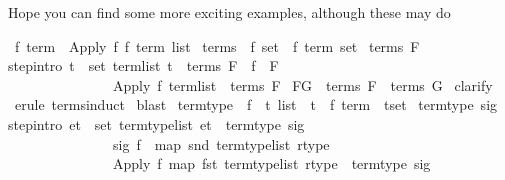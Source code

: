 \begin{isabellebody}
\begin{isamarkuptext}
Hope you can find some more exciting examples, although these may do%
\end{isamarkuptext}%
\ {\isacharprime}f\ {\isachardoublequote}term{\isachardoublequote}\ {\isacharequal}\ Apply\ {\isacharprime}f\ {\isachardoublequote}{\isacharprime}f\ term\ list{\isachardoublequote}\isanewline
\isanewline
{}\ terms\ {\isacharcolon}{\isacharcolon}\ {\isachardoublequote}{\isacharprime}f\ set\ {\isasymRightarrow}\ {\isacharprime}f\ term\ set{\isachardoublequote}\isanewline
{}\ {\isachardoublequote}terms\ F{\isachardoublequote}\isanewline
{}\isanewline
step{\isacharbrackleft}intro{\isacharbrackright}{\isacharcolon}\ {\isachardoublequote}{\isasymlbrakk}{\isasymforall}t\ {\isasymin}\ set\ term{\isacharunderscore}list{\isachardot}\ t\ {\isasymin}\ terms\ F{\isacharsemicolon}\ \ f\ {\isasymin}\ F{\isasymrbrakk}\isanewline
\ \ \ \ \ \ \ \ \ \ \ \ \ \ {\isasymLongrightarrow}\ {\isacharparenleft}Apply\ f\ term{\isacharunderscore}list{\isacharparenright}\ {\isasymin}\ terms\ F{\isachardoublequote}\isanewline
\isanewline
\isanewline
{}\ {\isachardoublequote}F{\isasymsubseteq}G\ {\isasymLongrightarrow}\ terms\ F\ {\isasymsubseteq}\ terms\ G{\isachardoublequote}\isanewline
{}\ clarify\isanewline
{}\ {\isacharparenleft}erule\ terms{\isachardot}induct{\isacharparenright}\isanewline
{}\ blast\isanewline
{}\isanewline
\isanewline
{}\ term{\isacharunderscore}type\ {\isacharcolon}{\isacharcolon}\ {\isachardoublequote}{\isacharparenleft}{\isacharprime}f\ {\isasymRightarrow}\ {\isacharprime}t\ list\ {\isacharasterisk}\ {\isacharprime}t{\isacharparenright}\ {\isasymRightarrow}\ {\isacharparenleft}{\isacharprime}f\ term\ {\isacharasterisk}\ {\isacharprime}t{\isacharparenright}set{\isachardoublequote}\isanewline
{}\ {\isachardoublequote}term{\isacharunderscore}type\ sig{\isachardoublequote}\isanewline
{}\isanewline
step{\isacharbrackleft}intro{\isacharbrackright}{\isacharcolon}\ {\isachardoublequote}{\isasymlbrakk}{\isasymforall}et\ {\isasymin}\ set\ term{\isacharunderscore}type{\isacharunderscore}list{\isachardot}\ et\ {\isasymin}\ term{\isacharunderscore}type\ sig{\isacharsemicolon}\ \isanewline
\ \ \ \ \ \ \ \ \ \ \ \ \ \ \ sig\ f\ {\isacharequal}\ {\isacharparenleft}map\ snd\ term{\isacharunderscore}type{\isacharunderscore}list{\isacharcomma}\ rtype{\isacharparenright}{\isasymrbrakk}\isanewline
\ \ \ \ \ \ \ \ \ \ \ \ \ \ {\isasymLongrightarrow}\ {\isacharparenleft}Apply\ f\ {\isacharparenleft}map\ fst\ term{\isacharunderscore}type{\isacharunderscore}list{\isacharparenright}{\isacharcomma}\ rtype{\isacharparenright}\ {\isasymin}\ term{\isacharunderscore}type\ sig{\isachardoublequote}\isanewline

\end{isabellebody}
